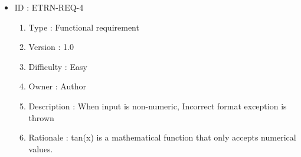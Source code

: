 \documentclass[12pt]{article}
\begin{document}
\begin{itemize}
\begin{enumerate}
    \end{enumerate}
\item ID : ETRN-REQ-4
    \begin{enumerate}
        \item Type : Functional requirement 
		\item Version : 1.0
		\item Difficulty : Easy
		\item Owner : Author
		\item Description : When input is non-numeric, Incorrect format exception is thrown
        \item Rationale : tan(x) is a mathematical function that only accepts numerical values.

    \end{enumerate}
\end{itemize}
\newpage
\end{document}
